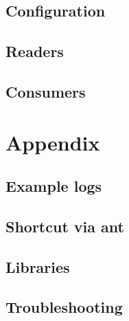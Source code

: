 \documentclass[a4paper, oneside, 11pt]{scrartcl}
\begin{document}
\subsection{Configuration}
\subsection{Readers}
\subsection{Consumers}

\section{Appendix}
\subsection{Example logs}
\subsection{Shortcut via ant}
\subsection{Libraries}
\subsection{Troubleshooting}
\end{document}
